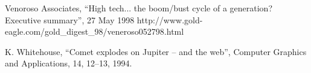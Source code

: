\documentclass{article}
\begin{document}
\begin{thebibliography}{99.}
Venoroso Associates, ``High tech... the boom/bust cycle of a generation?
Executive summary'', 27 May 1998
http://www.gold-eagle.com/gold\_digest\_98/veneroso052798.html



K. Whitehouse, ``Comet explodes on Jupiter -- and the web'', Computer
Graphics and Applications, 14, 12--13, 1994.  



\end{thebibliography}
\end{document}
